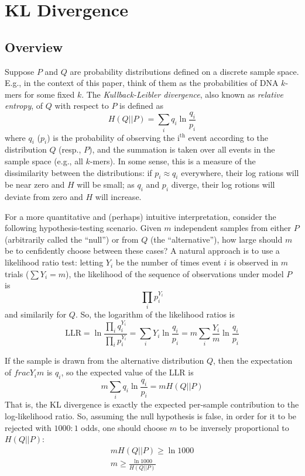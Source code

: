 \documentclass[letterpaper]{article}
\begin{document}
\section{KL Divergence}

\subsection{Overview}

Suppose $P$ and $Q$ are probability distributions defined on a discrete sample
space. E.g., in the context of this paper, think of them as the probabilities of
DNA $k$-mers for some fixed $k$. The \emph{Kullback-Leibler divergence}, also
known as \emph{relative entropy}, of $Q$ with respect to $P$ is defined as
$$H(Q||P) = \sum_{i} q_i \ln \frac{q_{i}}{p_{i}}$$
where $q_{i}$ ($p_{i}$) is the probability of observing the i$^{\text{th}}$
event according to the distribution $Q$ (resp., $P$), and the summation is taken
over all events in the sample space (e.g., all $k$-mers). In some sense, this is
a measure of the dissimilarity between the distributions: if $p_{i} \approx
q_{i}$ everywhere, their log rations will be near zero and $H$ will be small; as
$q_{i}$ and $p_{i}$ diverge, their log rotions will deviate from zero and $H$
will increase.

For a more quantitative and (perhaps) intuitive interpretation, consider the
following hypothesis-testing scenario. Given $m$ independent samples from either
$P$ (arbitrarily called the ``null'') or from $Q$ (the ``alternative''), how
large should $m$ be to cenfidently choose between these cases? A natural
approach is to use a likelihood ratio test: letting $Y_i$ be the number of times
event $i$ is observed in $m$ trials ($\sum Y_i = m$), the likelihood of the
sequence of observations under model $P$ is $$\prod_{i} p_{i}^{Y_{i}}$$
and similarily for $Q$. So, the logarithm of the likelihood ratios is
$$
\text{LLR} =
\ln \frac{\prod_{i} q_{i} ^ {Y_{i}}}{\prod_{i} p_{i} ^ {Y_{i}}}
= \sum_{i} Y_{i} \ln \frac{q_{i}}{p_{i}}
= m \sum_{i} \frac{Y_{i}}{m} \ln \frac{q_{i}}{p_{i}} $$

If the sample is drawn from the alternative distribution $Q$, then the
expectation of $frac{Y_{i}}{m}$ is $q_i$, so the expected value of the LLR is
$$ m \sum_{i} q_{i} \ln \frac{q_{i}}{p_{i}} = m H(Q || P) $$
That is, the KL divergence is exactly the expected per-sample contribution to
the log-likelihood ratio.
So, assuming the null hypothesis is false, in order for it to be rejected with
$1000:1$ odds, one should choose $m$ to be inversely proportional to $H(Q ||
P)$:
\begin{align*}
m H(Q||P) \ge \ln 1000 \\
m \ge \frac{\ln 1000}{H(Q || P)}
\end{align*}
\end{document}
